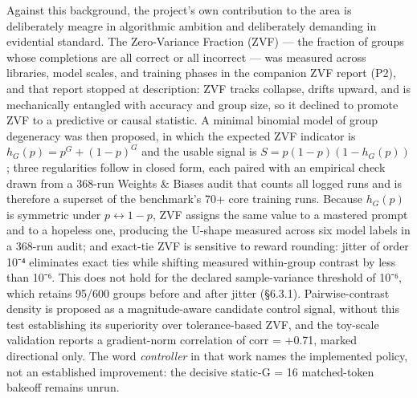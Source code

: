 \documentclass[12pt,a4paper]{report}
\begin{document}
Against this background, the project's own contribution to the area is
deliberately meagre in algorithmic ambition and deliberately demanding
in evidential standard. The Zero-Variance Fraction (ZVF) --- the
fraction of groups whose completions are all correct or all incorrect
--- was measured across libraries, model scales, and training phases in
the companion ZVF report (P2), and that report stopped at description:
ZVF tracks collapse, drifts upward, and is mechanically entangled with
accuracy and group size, so it declined to promote ZVF to a predictive
or causal statistic. A minimal binomial model of group degeneracy was
then proposed, in which the expected ZVF indicator is
\(h_G(p) = p^G + (1-p)^G\) and the usable signal is
\(S = p(1-p)(1-h_G(p))\); three regularities follow in closed form, each
paired with an empirical check drawn from a 368-run Weights \& Biases
audit that counts all logged runs and is therefore a superset of the
benchmark's 70+ core training runs. Because \(h_G(p)\) is symmetric
under \(p \leftrightarrow 1-p\), ZVF assigns the same value to a
mastered prompt and to a hopeless one, producing the U-shape measured
across six model labels in a 368-run audit; and exact-tie ZVF is
sensitive to reward rounding: jitter of order 10⁻⁴ eliminates exact ties
while shifting measured within-group contrast by less than 10⁻⁶. This
does not hold for the declared sample-variance threshold of 10⁻⁶, which
retains 95/600 groups before and after jitter (§6.3.1).
Pairwise-contrast density is proposed as a magnitude-aware candidate
control signal, without this test establishing its superiority over
tolerance-based ZVF, and the toy-scale validation reports a
gradient-norm correlation of corr = +0.71, marked directional only. The
word \emph{controller} in that work names the implemented policy, not an
established improvement: the decisive static-G = 16 matched-token
bakeoff remains unrun.
\end{document}
